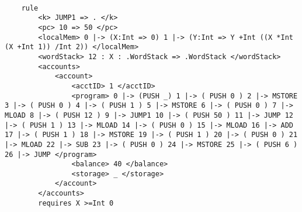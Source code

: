 \begin{verbatim}

    rule
        <k> JUMP1 => . </k> 
        <pc> 10 => 50 </pc> 
        <localMem> 0 |-> (X:Int => 0) 1 |-> (Y:Int => Y +Int ((X *Int (X +Int 1)) /Int 2)) </localMem>
        <wordStack> 12 : X : .WordStack => .WordStack </wordStack> 
        <accounts> 
            <account> 
	            <acctID> 1 </acctID> 
	            <program> 0 |-> (PUSH _) 1 |-> ( PUSH 0 ) 2 |-> MSTORE 3 |-> ( PUSH 0 ) 4 |-> ( PUSH 1 ) 5 |-> MSTORE 6 |-> ( PUSH 0 ) 7 |-> MLOAD 8 |-> ( PUSH 12 ) 9 |-> JUMP1 10 |-> ( PUSH 50 ) 11 |-> JUMP 12 |-> ( PUSH 1 ) 13 |-> MLOAD 14 |-> ( PUSH 0 ) 15 |-> MLOAD 16 |-> ADD 17 |-> ( PUSH 1 ) 18 |-> MSTORE 19 |-> ( PUSH 1 ) 20 |-> ( PUSH 0 ) 21 |-> MLOAD 22 |-> SUB 23 |-> ( PUSH 0 ) 24 |-> MSTORE 25 |-> ( PUSH 6 ) 26 |-> JUMP </program> 
	            <balance> 40 </balance>
	            <storage> _ </storage>        
            </account> 
        </accounts> 
        requires X >=Int 0 
\end{verbatim}


